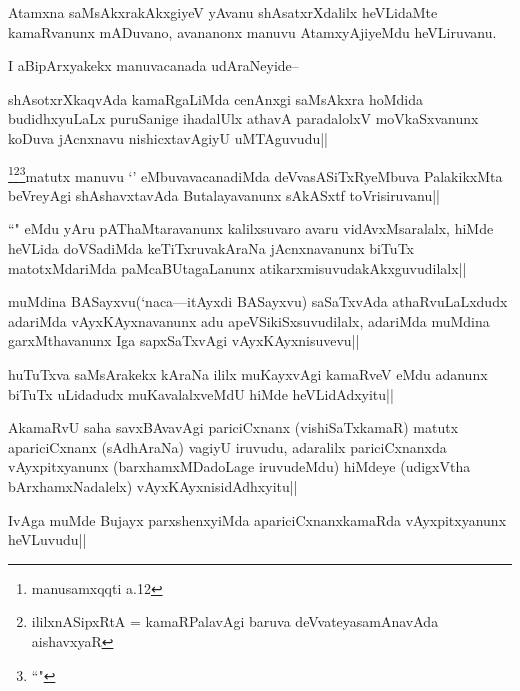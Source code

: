 \begin{artha}
Atamxna saMsAkxrakAkxgiyeV yAvanu shAsatxrXdalilx heVLidaMte kamaRvanunx mADuvano, avananonx manuvu AtamxyAjiyeMdu heVLiruvanu.
\end{artha}

\begin{artha}
I aBipArxyakekx manuvacanada udAraNeyide--
\end{artha}

\begin{artha}
shAsotxrXkaqvAda kamaRgaLiMda cenAnxgi saMsAkxra hoMdida budidhxyuLaLx puruSanige ihadalUlx athavA paradalolxV moVkaSxvanunx koDuva jAcnxnavu nishicxtavAgiyU uMTAguvudu||
\end{artha}

\begin{artha}
\footnote{\stext \stext manusamxqqti a.12}\footnote{\stext ililxnASipxRtA = kamaRPalavAgi baruva deVvateyasamAnavAda aishavxyaR}\footnote{``\stext"}matutx manuvu `\stext' eMbuvavacanadiMda deVvasASiTxRyeMbuva PalakikxMta beVreyAgi shAshavxtavAda Butalayavanunx sAkASxtf toVrisiruvanu||
\end{artha}

\begin{artha}
``\stext" eMdu yAru pAThaMtaravanunx kalilxsuvaro avaru vidAvxMsaralalx, hiMde heVLida doVSadiMda keTiTxruvakAraNa jAcnxnavanunx biTuTx matotxMdariMda paMcaBUtagaLanunx atikarxmisuvudakAkxguvudilalx||
\end{artha}

\begin{artha}
muMdina BASayxvu(`naca---itAyxdi BASayxvu) saSaTxvAda athaRvuLaLxdudx adariMda vAyxKAyxnavanunx adu apeVSikiSxsuvudilalx, adariMda muMdina garxMthavanunx Iga sapxSaTxvAgi vAyxKAyxnisuvevu||	
\end{artha}

\begin{artha}
huTuTxva saMsArakekx kAraNa ililx muKayxvAgi kamaRveV eMdu adanunx biTuTx uLidadudx muKavalalxveMdU hiMde heVLidAdxyitu||
\end{artha}

\begin{artha}
AkamaRvU saha savxBAvavAgi pariciCxnanx (vishiSaTxkamaR) matutx apariciCxnanx (sAdhAraNa) vagiyU iruvudu, adaralilx pariciCxnanxda vAyxpitxyanunx (barxhamxMDadoLage iruvudeMdu) hiMdeye (udigxVtha bArxhamxNadalelx) vAyxKAyxnisidAdhxyitu||
\end{artha}

\begin{artha}
IvAga muMde Bujayx parxshenxyiMda apariciCxnanxkamaRda vAyxpitxyanunx heVLuvudu||
\end{artha}

